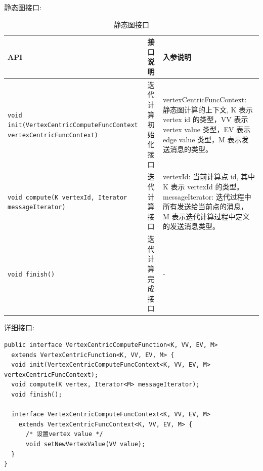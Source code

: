静态图接口:
\begin{table}[H]
  \caption{静态图接口}
  \begin{center}
    \begin{tabularx}{\textwidth}{XlX}
      \toprule
      \textbf{API} & \textbf{接口说明} & \textbf{入参说明} \\
      \midrule
      \texttt{void init(\newline VertexCentricComputeFuncContext vertexCentricFuncContext)}
                   & 迭代计算初始化接口
                   & vertexCentricFuncContext: 静态图计算的上下文, K 表示 vertex
                   id 的类型，VV 表示 vertex value 类型，EV 表示 edge
                   value 类型，M 表示发送消息的类型。 \\
      \texttt{void compute(K vertexId, Iterator messageIterator)}
                   & 迭代计算接口
                   & vertexId: 当前计算点 id, 其中 K 表示 vertexId 的类型。
                   messageIterator: 迭代过程中所有发送给当前点的消息，
                   M 表示迭代计算过程中定义的发送消息类型。 \\
      \texttt{void finish()}
                   & 迭代计算完成接口
                   & - \\
      \bottomrule
    \end{tabularx}
  \end{center}
\end{table}

详细接口:
\begin{center}
\begin{verbatim}
public interface VertexCentricComputeFunction<K, VV, EV, M>
  extends VertexCentricFunction<K, VV, EV, M> {
  void init(VertexCentricComputeFuncContext<K, VV, EV, M> vertexCentricFuncContext);
  void compute(K vertex, Iterator<M> messageIterator);
  void finish();

  interface VertexCentricComputeFuncContext<K, VV, EV, M>
    extends VertexCentricFuncContext<K, VV, EV, M> {
      /* 设置vertex value */
      void setNewVertexValue(VV value);
  }
}
\end{verbatim}
\end{center}
